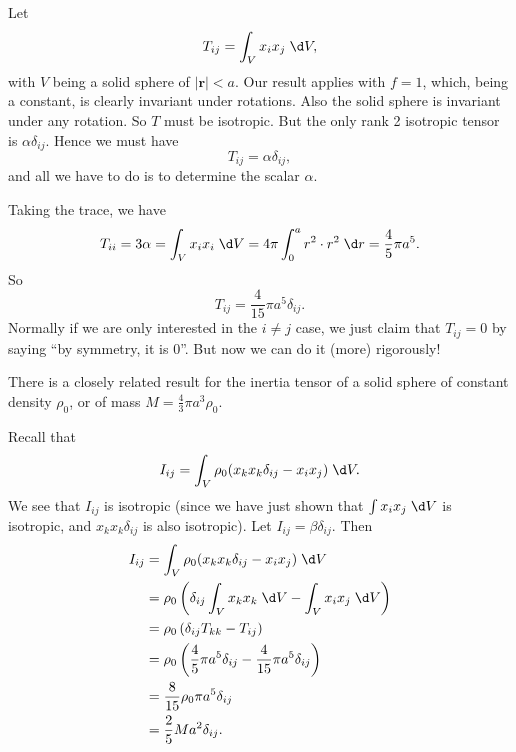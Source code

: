 \documentclass[a4paper]{article}
\begin{document}
\begin{eg}
  Let
  \[
    T_{ij} = \int_V x_i x_j \;\d V,
  \]
  with $V$ being a solid sphere of $|\mathbf{r}| < a$. Our result applies with $f = 1$, which, being a constant, is clearly invariant under rotations. Also the solid sphere is invariant under any rotation. So $T$ must be isotropic. But the only rank 2 isotropic tensor is $\alpha \delta_{ij}$. Hence we must have
  \[
    T_{ij} = \alpha \delta_{ij},
  \]
  and all we have to do is to determine the scalar $\alpha$.

  Taking the trace, we have
  \[
    T_{ii} = 3\alpha = \int_V x_i x_i \;\d V = 4\pi \int_0^a r^2 \cdot r^2\;\d r = \frac{4}{5}\pi a^5.
  \]
  So
  \[
    T_{ij} = \frac{4}{15}\pi a^5 \delta_{ij}.
  \]
  Normally if we are only interested in the $i \not= j$ case, we just claim that $T_{ij} = 0$ by saying ``by symmetry, it is $0$''. But now we can do it (more) rigorously!

  There is a closely related result for the inertia tensor of a solid sphere of constant density $\rho_0$, or of mass $M = \frac{4}{3}\pi a^3 \rho_0$.

  Recall that
  \[
    I_{ij} = \int_V \rho_0 (x_k x_k \delta_{ij} - x_i x_j)\;\d V.
  \]
  We see that $I_{ij}$ is isotropic (since we have just shown that $\int x_i x_j\;\d V$ is isotropic, and $x_kx_k \delta_{ij}$ is also isotropic). Let $I_{ij} = \beta \delta_{ij}$. Then
  \begin{align*}
    I_{ij} &= \int_V \rho_0 (x_k x_k \delta_{ij} - x_ix_j)\;\d V \\
    &= \rho_0\left(\delta_{ij}\int_V x_k x_k\;\d V - \int_V x_ix_j \;\d V\right)\\
    &= \rho_0\left(\delta_{ij}T_{kk} - T_{ij}\right)\\
    &= \rho_0\left(\frac{4}{5}\pi a^5\delta_{ij} - \frac{4}{15}\pi a^5 \delta_{ij}\right)\\
    &= \frac{8}{15}\rho_0 \pi a^5 \delta_{ij}\\
    &= \frac{2}{5}Ma^2 \delta_{ij}.
  \end{align*}
\end{eg}
\end{document}

